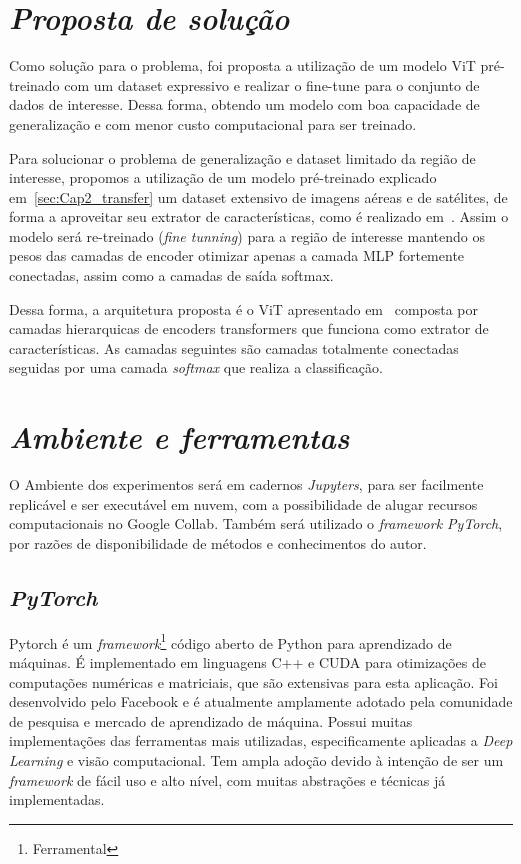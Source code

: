 \section{\textit{Proposta de solução}}\label{sec:Cap3_Proposta}

Como solução para o problema, foi proposta a utilização de um modelo ViT pré-treinado com um dataset expressivo e realizar o fine-tune para o conjunto de dados de interesse. Dessa forma, obtendo um modelo com boa capacidade de generalização e com menor custo computacional para ser treinado.

Para solucionar o problema de generalização e dataset limitado da região de interesse, propomos a utilização de um modelo pré-treinado explicado em~\ref{sec:Cap2_transfer} um dataset extensivo de imagens aéreas e de satélites, de forma a aproveitar seu extrator de características, como é realizado em~\cite{wang2022empirical}. Assim o modelo será re-treinado (\textit{fine tunning}) para a região de interesse mantendo os pesos das camadas de encoder otimizar apenas a camada MLP fortemente conectadas, assim como a camadas de saída softmax. 

Dessa forma, a arquitetura proposta é o ViT apresentado em~\cite{wang2022empirical}
composta por camadas hierarquicas de encoders transformers  que funciona como extrator de características. As camadas seguintes são camadas totalmente conectadas seguidas por uma camada \textit{softmax} que realiza a classificação.

\section{\textit{Ambiente e ferramentas}}\label{sec:Cap3_Ferramentas}


O Ambiente dos experimentos será em cadernos \textit{Jupyters}, para ser facilmente replicável e ser executável em nuvem, com a possibilidade de alugar recursos computacionais no Google Collab. Também será utilizado o \textit{framework PyTorch}, por razões de disponibilidade de métodos e conhecimentos do autor.

\subsection{\textit{PyTorch}}\label{sec:Cap2_PyTorch}
Pytorch é um \textit{framework}\footnote{Ferramental} código aberto de Python para aprendizado de máquinas. É implementado em linguagens C++ e CUDA para otimizações de computações numéricas e matriciais, que são extensivas para esta aplicação.
Foi desenvolvido pelo Facebook e é atualmente amplamente adotado pela comunidade de pesquisa e mercado de aprendizado de máquina. Possui muitas implementações das ferramentas mais utilizadas, especificamente aplicadas a \textit{Deep Learning} e visão computacional. Tem ampla adoção devido à intenção de ser um \textit{framework} de fácil uso e alto nível, com muitas abstrações e técnicas já implementadas.


